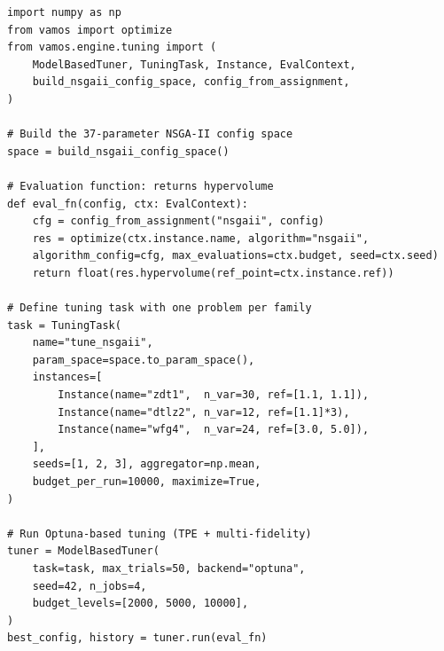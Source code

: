 \documentclass[journal]{IEEEtran}
\begin{document}
\begin{lstlisting}[float=*,caption={\textcolor{red}{Autotuning NSGA-II with Optuna on ZDT1, DTLZ2, and WFG4.}},label={lst:optuna_tune}]
import numpy as np
from vamos import optimize
from vamos.engine.tuning import (
    ModelBasedTuner, TuningTask, Instance, EvalContext,
    build_nsgaii_config_space, config_from_assignment,
)

# Build the 37-parameter NSGA-II config space
space = build_nsgaii_config_space()

# Evaluation function: returns hypervolume
def eval_fn(config, ctx: EvalContext):
    cfg = config_from_assignment("nsgaii", config)
    res = optimize(ctx.instance.name, algorithm="nsgaii",    
    algorithm_config=cfg, max_evaluations=ctx.budget, seed=ctx.seed)
    return float(res.hypervolume(ref_point=ctx.instance.ref))

# Define tuning task with one problem per family
task = TuningTask(
    name="tune_nsgaii",
    param_space=space.to_param_space(),
    instances=[
        Instance(name="zdt1",  n_var=30, ref=[1.1, 1.1]),
        Instance(name="dtlz2", n_var=12, ref=[1.1]*3),
        Instance(name="wfg4",  n_var=24, ref=[3.0, 5.0]),
    ],
    seeds=[1, 2, 3], aggregator=np.mean,
    budget_per_run=10000, maximize=True,
)

# Run Optuna-based tuning (TPE + multi-fidelity)
tuner = ModelBasedTuner(
    task=task, max_trials=50, backend="optuna",
    seed=42, n_jobs=4,
    budget_levels=[2000, 5000, 10000],
)
best_config, history = tuner.run(eval_fn)
\end{lstlisting}



\end{document}

